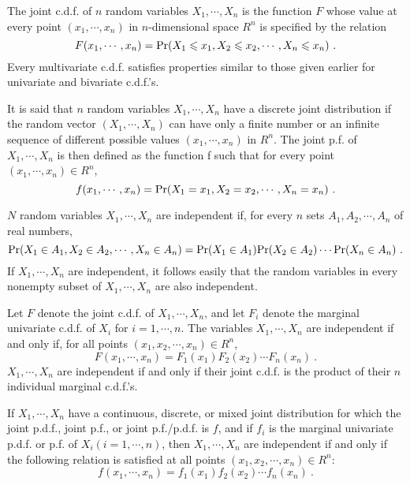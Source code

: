 \documentclass[12pt,a4paper]{article}
\begin{document}
The joint c.d.f. of $n$ random variables $X_1, \cdots, X_n$ is the function $F$ whose value at every point $(x_1, \cdots, x_n)$ in $n$-dimensional space $R^n$ is specified by the relation
\begin{equation}
F(x_1, \cdots, x_n) = {\rm Pr}(X_1 \leqslant x_1, X_2 \leqslant x_2, \cdots, X_n \leqslant x_n) ~.
\end{equation}
Every multivariate c.d.f. satisfies properties similar to those given earlier for univariate and bivariate c.d.f.'s.

It is said that $n$ random variables $X_1, \cdots, X_n$ have a discrete joint distribution if the random vector $(X_1, \cdots, X_n)$ can have only a finite number or an infinite sequence of different possible values $(x_1, \cdots, x_n)$ in $R^n$. The joint p.f. of $X_1, \cdots, X_n$ is then defined as the function f such that for every point $(x_1, \cdots, x_n) \in R^n$,
\begin{equation*}
f(x_1, \cdots, x_n) = {\rm Pr}(X_1 = x_1, X_2 = x_2, \cdots, X_n = x_n) ~.
\end{equation*}




$N$ random variables $X_1, \cdots, X_n$ are independent if, for every $n$ sets $A_1, A_2, \cdots, A_n$ of real numbers, 
\begin{equation*}
{\rm Pr}(X_1 \in A_1, X_2 \in A_2, \cdots, X_n \in A_n) = {\rm Pr}(X_1 \in A_1){\rm Pr}(X_2 \in A_2) \cdots {\rm Pr}(X_n \in A_n) ~.
\end{equation*}
If $X_1, \cdots, X_n$ are independent, it follows easily that the random variables in every nonempty subset of $X_1, \cdots, X_n$ are also independent.

Let $F$ denote the joint c.d.f. of $X_1, \cdots, X_n$, and let $F_i$ denote the marginal univariate c.d.f. of $X_i$ for $i = 1, \cdots, n$. The variables $X_1, \cdots, X_n$ are independent if and only if, for all points $(x_1, x_2, \cdots, x_n) \in R^n$,
\begin{equation*}
F(x_1, \cdots, x_n) = F_1(x_1)F_2(x_2)\cdots F_n(x_n) ~.
\end{equation*}
$X_1, \cdots, X_n$ are independent if and only if their joint c.d.f. is the product of their $n$ individual marginal c.d.f.'s. 

If $X_1, \cdots, X_n$ have a continuous, discrete, or mixed joint distribution for which the joint p.d.f., joint p.f., or joint p.f./p.d.f. is $f$, and if $f_i$ is the marginal univariate p.d.f. or p.f. of $X_i (i = 1, \cdots, n)$, then $X_1, \cdots, X_n$ are independent if and only if the following relation is satisfied at all points $(x_1, x_2, \cdots, x_n) \in R^n$:
\begin{equation*}
f(x_1, \cdots, x_n) = f_1(x_1)f_2(x_2)\cdots f_n(x_n) ~.
\end{equation*}
\end{document}
